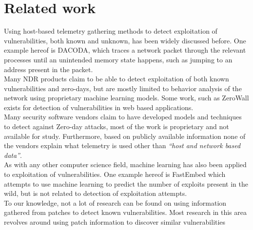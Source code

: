 \documentclass{report}
\begin{document}
\section{Related work}
Using host-based telemetry gathering methods to detect exploitation of vulnerabilities, both known and unknown, has been widely discussed before\cite{paper:related-work:taint-check}\cite{paper:related-work:dacoda}. One example hereof is DACODA\cite{paper:related-work:dacoda}, which traces a network packet through the relevant processes until an unintended memory state happens, such as jumping to an address present in the packet.
\\
Many \gls{NDR} products claim to be able to detect exploitation of both known vulnerabilities and zero-days\cite{url:0-day-detection:darktrace}\cite{url:0-day-detection:wehowsky}, but are mostly limited to behavior analysis of the network using proprietary machine learning models. Some work, such as ZeroWall\cite{tang2020zerowall} exists for detection of vulnerabilities in web based applications.
\\
Many security software vendors claim to have developed models and techniques to detect against Zero-day attacks\cite{url:0-day-detection:checkpoint}\cite{url:0-day-detection:capsule8}\cite{url:0-day-detection:logsign}, most of the work is proprietary and not available for study. Furthermore, based on publicly available information none of the vendors explain what telemetry is used other than \emph{``host and network based data''}.
\\
As with any other computer science field, machine learning has also been applied to exploitation of vulnerabilities. One example hereof is FastEmbed\cite{10.1371/journal.pone.0228439} which attempts to use machine learning to predict the number of exploits present in the wild, but is not related to detection of exploitation attempts.
\\
To our knowledge, not a lot of research can be found on using information gathered from patches to detect known vulnerabilities. Most research in this area revolves around using patch information to discover similar vulnerabilities\cite{xiao2020mvp}\cite{li2016vulpecker}

\end{document}
